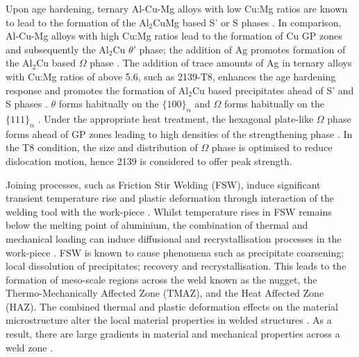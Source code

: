 	Upon age hardening, ternary Al-Cu-Mg alloys with low Cu:Mg ratios are known to lead to the formation of the $\text{Al}_2$CuMg based S' or S phases \cite{Bakavos2008}. In comparison, Al-Cu-Mg alloys with high Cu:Mg ratios lead to the formation of Cu GP zones and subsequently the $\text{Al}_2$Cu $\theta'$ phase; the addition of Ag promotes formation of the $\text{Al}_2$Cu based $\Omega$ phase \cite{Bakavos2008,Muddle1989,Nie2001}. The addition of trace amounts of Ag in ternary alloys with Cu:Mg ratios of above 5.6, such as 2139-T8, enhances the age hardening response and promotes the formation of $\text{Al}_2$Cu based precipitates ahead of S' and S phases \cite{Bakavos2008}. $\theta$ forms habitually on the $\text{\{100\}}_\mathrm{\alpha}$ and $\Omega$ forms habitually on the $\text{\{111\}}_\mathrm{\alpha}$ \cite{Elkhodary2011b}. Under the appropriate heat treatment, the hexagonal plate-like $\Omega$ phase forms ahead of GP zones leading to high densities of the strengthening phase \cite{Bakavos2008}. In the T8 condition, the size and distribution of $\Omega$ phase is optimised to reduce dislocation motion, hence 2139 is considered to offer peak strength.
	
	Joining processes, such as Friction Stir Welding (FSW), induce significant transient temperature rise and plastic deformation through interaction of the welding tool with the work-piece \cite{Mishra2005,Robson2006a}. Whilst temperature rises in FSW remains below the melting point of aluminium, the combination of thermal and mechanical loading can induce diffusional and recrystallisation processes in the work-piece \cite{Sato1999,Sato1999a,Sato2001}. FSW is known to cause phenomena such as precipitate coarsening; local dissolution of precipitates; recovery and recrystallisation. This leads to the formation of meso-scale regions across the weld known as the nugget, the Thermo-Mechanically Affected Zone (TMAZ), and the Heat Affected Zone (HAZ). The combined thermal and plastic deformation effects on the material microstructure alter the local material properties in welded structures \cite{Sato1999,Sato1999a,Sato2001,Mishra2005}. As a result, there are large gradients in material and mechanical properties across a weld zone \cite{Mahoney1998}. 
	
